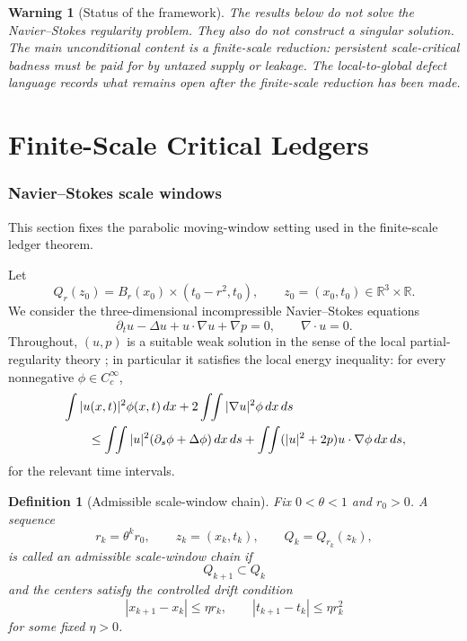 \documentclass[11pt]{article}
\numberwithin{equation}{section}
\newtheorem{definition}[theorem]{Definition}
\newtheorem{warning}[theorem]{Warning}
\newcommand{\R}{\mathbb R}
\newcommand{\dd}{\,d}
\begin{document}
\begin{warning}[Status of the framework]
The results below do not solve the Navier--Stokes regularity problem.  They also do not construct a singular solution.  The main unconditional content is a finite-scale reduction: persistent scale-critical badness must be paid for by untaxed supply or leakage.  The local-to-global defect language records what remains open after the finite-scale reduction has been made.
\end{warning}

\part{Finite-Scale Critical Ledgers}
\section{Navier--Stokes scale windows}\label{sec:scale-windows}
\noindent This section fixes the parabolic moving-window setting used in the finite-scale ledger theorem.

Let
\[
Q_r(z_0)=B_r(x_0)\times (t_0-r^2,t_0),
\qquad z_0=(x_0,t_0)\in \R^3\times \R.
\]
We consider the three-dimensional incompressible Navier--Stokes equations
\begin{equation}\label{eq:NS}
\partial_t u-\Delta u+u\cdot\nabla u+\nabla p=0,
\qquad \nabla\cdot u=0.
\end{equation}
Throughout, $(u,p)$ is a suitable weak solution in the sense of the local partial-regularity theory \cite{Scheffer1977,CKN1982,SereginLectureNotes}; in particular it satisfies the local energy inequality: for every nonnegative $\phi\in C_c^\infty$,
\begin{align}\label{eq:LEI}
&\int |u(x,t)|^2\phi(x,t)\dd x
+2\int \!\! \int |\nabla u|^2\phi\dd x\dd s  
\notag\\
&\qquad\leq
\int \!\! \int |u|^2(\partial_s\phi+\Delta\phi)\dd x\dd s
+
\int \!\! \int (|u|^2+2p)u\cdot\nabla\phi\dd x\dd s,
\end{align}
for the relevant time intervals.

\begin{definition}[Admissible scale-window chain]\label{def:chain}
Fix $0<\theta<1$ and $r_0>0$.  A sequence
\[
r_k=\theta^k r_0,
\qquad z_k=(x_k,t_k),
\qquad Q_k=Q_{r_k}(z_k),
\]
is called an admissible scale-window chain if
\[
Q_{k+1}\subset Q_k
\]
and the centers satisfy the controlled drift condition
\[
|x_{k+1}-x_k|\leq \eta r_k,
\qquad
|t_{k+1}-t_k|\leq \eta r_k^2
\]
for some fixed $\eta>0$.
\end{definition}
\end{document}
